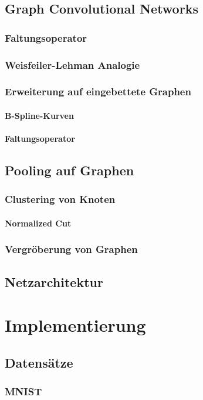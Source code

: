 \section{Graph Convolutional Networks}
\subsection{Faltungsoperator}
\subsection{Weisfeiler-Lehman Analogie}
\subsection{Erweiterung auf eingebettete Graphen}
\subsubsection{B-Spline-Kurven}
\subsubsection{Faltungsoperator}
\section{Pooling auf Graphen}
\subsection{Clustering von Knoten}
\subsubsection{Normalized Cut}
\subsection{Vergröberung von Graphen}
\section{Netzarchitektur}

\chapter{Implementierung}
\section{Datensätze}
\subsection{MNIST}
